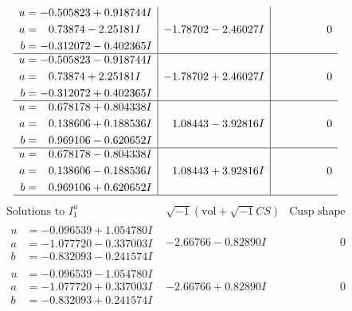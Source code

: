 \documentclass[1p]{elsarticle_modified}
\theoremstyle{definition}
\newcommand{\I}{\sqrt{-1}}
\begin{document}
$$\begin{array}{c|c|c}
\begin{aligned}
u &= -0.505823 + 0.918744 I \\
a &= \phantom{-}0.73874 - 2.25181 I \\
b &= -0.312072 - 0.402365 I\end{aligned}
 & -1.78702 - 2.46027 I & \phantom{-0.000000 } 0 \\ \hline\begin{aligned}
u &= -0.505823 - 0.918744 I \\
a &= \phantom{-}0.73874 + 2.25181 I \\
b &= -0.312072 + 0.402365 I\end{aligned}
 & -1.78702 + 2.46027 I & \phantom{-0.000000 } 0 \\ \hline\begin{aligned}
u &= \phantom{-}0.678178 + 0.804338 I \\
a &= \phantom{-}0.138606 + 0.188536 I \\
b &= \phantom{-}0.969106 - 0.620652 I\end{aligned}
 & \phantom{-}1.08443 - 3.92816 I & \phantom{-0.000000 } 0 \\ \hline\begin{aligned}
u &= \phantom{-}0.678178 - 0.804338 I \\
a &= \phantom{-}0.138606 - 0.188536 I \\
b &= \phantom{-}0.969106 + 0.620652 I\end{aligned}
 & \phantom{-}1.08443 + 3.92816 I & \phantom{-0.000000 } 0\\
 \hline 
 \end{array}$$\newpage$$\begin{array}{c|c|c}  
\text{Solutions to }I^u_{1}& \I (\text{vol} + \sqrt{-1}CS) & \text{Cusp shape}\\
 \hline 
\begin{aligned}
u &= -0.096539 + 1.054780 I \\
a &= -1.077720 - 0.337003 I \\
b &= -0.832093 - 0.241574 I\end{aligned}
 & -2.66766 - 0.82890 I & \phantom{-0.000000 } 0 \\ \hline\begin{aligned}
u &= -0.096539 - 1.054780 I \\
a &= -1.077720 + 0.337003 I \\
b &= -0.832093 + 0.241574 I\end{aligned}
 & -2.66766 + 0.82890 I & \phantom{-0.000000 } 0 \\ \hline\begin{aligned}

\end{aligned}
\end{array}$$
\end{document}
